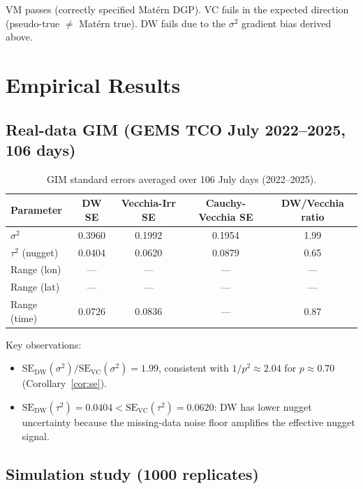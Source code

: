\documentclass[12pt]{article}
\begin{document}
VM passes (correctly specified Matérn DGP). VC fails in the expected
direction (pseudo-true $\neq$ Matérn true). DW fails due to the
$\sigma^2$ gradient bias derived above.


\section{Empirical Results}
\label{sec:empirical}

\subsection{Real-data GIM (GEMS TCO July 2022--2025, 106 days)}

\begin{table}[h]
\centering
\caption{GIM standard errors averaged over 106 July days (2022--2025).}
\begin{tabular}{lcccc}
\toprule
Parameter & DW SE & Vecchia-Irr SE & Cauchy-Vecchia SE & DW/Vecchia ratio \\
\midrule
$\sigma^2$ & 0.3960 & 0.1992 & 0.1954 & 1.99 \\
$\tau^2$ (nugget) & 0.0404 & 0.0620 & 0.0879 & 0.65 \\
Range (lon) & --- & --- & --- & --- \\
Range (lat) & --- & --- & --- & --- \\
Range (time) & 0.0726 & 0.0836 & --- & 0.87 \\
\bottomrule
\end{tabular}
\label{tab:gim}
\end{table}

Key observations:
\begin{itemize}
  \item $\mathrm{SE}_{\mathrm{DW}}(\sigma^2)/\mathrm{SE}_{\mathrm{VC}}(\sigma^2)
        = 1.99$, consistent with $1/p^2 \approx 2.04$ for $p\approx 0.70$
        (Corollary~\ref{cor:se}).
  \item $\mathrm{SE}_{\mathrm{DW}}(\tau^2) = 0.0404 <
        \mathrm{SE}_{\mathrm{VC}}(\tau^2) = 0.0620$: DW has lower
        nugget uncertainty because the missing-data noise floor amplifies
        the effective nugget signal.
\end{itemize}

\subsection{Simulation study (1000 replicates)}
\end{document}
